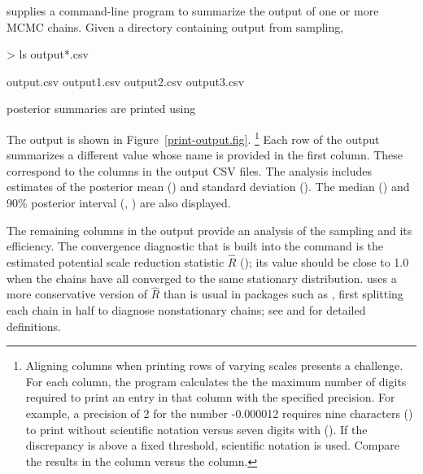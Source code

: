 \documentclass[article]{jss}
\begin{document}
 supplies a command-line program  to
summarize the output of one or more MCMC chains.  Given a directory
containing output from sampling,
%
\begin{CodeChunk}
\begin{CodeInput}
> ls output*.csv
\end{CodeInput}
\begin{CodeOutput}
output.csv	output1.csv	output2.csv	output3.csv
\end{CodeOutput}
\end{CodeChunk}
%
posterior summaries are printed using
%
\begin{CodeChunk}
\end{CodeChunk}
%
The output is shown in Figure~\ref{print-output.fig}.%
%
\footnote{Aligning columns when printing rows of varying scales
  presents a challenge.  For each column, the program calculates the
  the maximum number of digits required to print an entry in that
  column with the specified precision. For example, a precision of 2
  for the number -0.000012 requires nine characters ()
  to print without scientific notation versus seven digits with
  ().  If the discrepancy is above a fixed threshold,
  scientific notation is used.  Compare the results in the 
  column versus the  column.}
%
Each row of the output summarizes a different value whose name is
provided in the first column.  These correspond to the columns in the
output CSV files. The analysis includes estimates of the posterior
mean () and standard deviation ().  The median
() and 90\% posterior interval (, )
are also displayed.  

The remaining columns in the output provide an analysis of the
sampling and its efficiency.  The convergence diagnostic that is built
into the  command is the estimated potential scale
reduction statistic $$ (); its value should be close
to 1.0 when the chains have all converged to the same stationary
distribution.   uses a more conservative version of
$$ than is usual in packages such as 
\citep{PlummerEtAl:2006}, first splitting each chain in half to
diagnose nonstationary chains; see \citep{GelmanEtAl:2013} and
\citep{Stan:2013} for detailed definitions.
\end{document}
